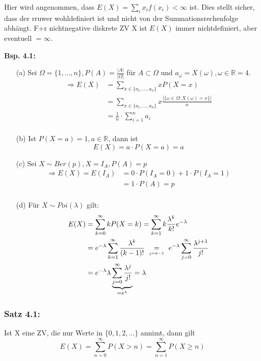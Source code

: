 \documentclass[a4paper,11pt]{article}
\newcommand\jekmo{\underset{\mathclap{\scriptscriptstyle j=k-1}}{=}}
\begin{document}
\vspace{6pt}
\noindent Hier wird angenommen, dass $E(X)=\sum_{i}x_if(x_i)<\infty$ ist. Dies stellt sicher, dass der rruwer wohldefiniert ist und nicht von der Summationsrechenfolge abhängt. 
F+r nichtnegative diskrete ZV X ist $E(X)$ immer nichtdefiniert, aber eventuell $=\infty$.

\vspace{6pt}
\noindent\textbf{Bsp. 4.1:}
\begin{itemize}
\item[(a)] Sei $\Omega=\{1,\dots,n\}, P(A)=\frac{|A|}{|\Omega|}$ für $A\subset\Omega$ und $a_\omega=X(\omega),\omega\in\mathbb{R}=4$.
\newline \begin{align*}
\Rightarrow E(X) &= \sum_{x\in\{a_1,\dots,a_n\}}xP(X=x)\\
&= \sum_{x\in\{a_1,\dots,a_n\}}x\frac{|\{\omega\in\Omega:X(\omega)=x\}|}{n}\\
&= \frac{1}{n}\cdot\sum_{i=1}^{n}a_i\\
\end{align*}
\item[(b)] Ist $P(X=a)=1, a\in\mathbb{R}$, dann ist 
\[E(X)=a\cdot P(X=a)=a\]
\item[(c)] Sei $X\sim Ber(p), X=I_A, P(A)=p$
\begin{align*}
\Rightarrow E(X)=E(I_A) &= 0\cdot P(I_A=0)+1\cdot P(I_A=1)\\
&= 1\cdot P(A)=p\\
\end{align*}
\item[(d)] Für $X\sim Poi(\lambda)$ gilt: 
\begin{align*}
E(X) &= \sum_{k=0}^{\infty}kP(X=k) = \sum_{k=1}^{\infty}k\frac{\lambda^k}{k!}e^{-\lambda}\\
&= e^{-\lambda}\sum_{k=1}^{\infty}\frac{\lambda^k}{(k-1)!} \hspace{10pt} \jekmo \hspace{10pt} e^{-\lambda}\sum_{j=0}^{\infty}\frac{\lambda^{j+1}}{j!}\\
&= e^{-\lambda}\lambda\underbrace{\sum_{j=0}^{\infty}\frac{\lambda^j}{j!}}_{= e^\lambda}=\lambda
\end{align*}
\end{itemize}

\subsubsection{Satz 4.1:}
Ist X eine ZV, die nur Werte in $\{0,1,2,\dots\}$ annimt, dann gilt
\[E(X)=\sum_{n=0}^{\infty}P(X>n)=\sum_{n=1}^{\infty}P(X\geq n)\]
\end{document}
